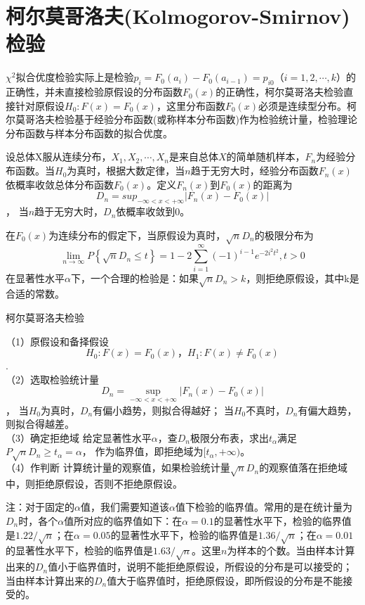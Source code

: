 \section{柯尔莫哥洛夫(Kolmogorov-Smirnov)检验}

$\chi^2$拟合优度检验实际上是检验$p_i=F_0(a_i)-F_0(a_{i-1})=p_{i0}（i=1,2,\cdots,k）$的正确性，并未直接检验原假设的分布函数$F_0(x)$的正确性，柯尔莫哥洛夫检验直接针对原假设$H_0:F(x)=F_0(x)$，这里分布函数$F_0(x)$必须是连续型分布。柯尔莫哥洛夫检验基于经验分布函数(或称样本分布函数)作为检验统计量，检验理论分布函数与样本分布函数的拟合优度。

设总体X服从连续分布，$X_1,X_2,\cdots,X_n$是来自总体$X$的简单随机样本，$F_n$为经验分布函数。当$H_0$为真时，根据大数定律，当$n$趋于无穷大时，经验分布函数$F_n(x)$依概率收敛总体分布函数$F_0(x)$。定义$F_n(x)$到$F_0(x)$的距离为
$$D_n={sup}_{-\infty<x<+\infty}\left|F_n(x)-F_0(x)\right|$$，
当$n$趋于无穷大时，$D_n$依概率收敛到$0$。

\begin{theorem}[Kolmogorov定理]  
    在$F_0(x)$为连续分布的假定下，当原假设为真时，$\sqrt n D_n$的极限分布为
$$ \lim _{n \rightarrow \infty} P\left\{\sqrt{n} D_{n} \leq t\right\}=1-2 \sum_{i=1}^{\infty}(-1)^{i-1} e^{-2 i^{2} t^{2}}, t>0 $$  
在显著性水平$\alpha$下，一个合理的检验是：如果$\sqrt n D_n>k$，则拒绝原假设，其中k是合适的常数。   
\end{theorem}

\begin{algorithm}[]
    \caption{柯尔莫哥洛夫检验}
     （1）原假设和备择假设
$$  H_0:F(x)=F_0(x)，H_1:F(x)\neq F_0(x)$$.\\
（2）选取检验统计量
$$D_n=\operatorname{sup}_{-\infty<x<+\infty} \left|F_n(x)-F_0(x)\right|$$，
当$H_0$为真时，$D_n$有偏小趋势，则拟合得越好；
当$H_0$不真时，$D_n$有偏大趋势，则拟合得越差。\\
（3）确定拒绝域
给定显著性水平$\alpha$，查$D_n$极限分布表，求出$t_\alpha$满足
$P{\sqrt n D_n\geq t_\alpha}=\alpha$，
作为临界值，即拒绝域为$[t_\alpha,+\infty)$。\\
（4）作判断
计算统计量的观察值，如果检验统计量$\sqrt n D_n$的观察值落在拒绝域中，则拒绝原假设，否则不拒绝原假设。   
\end{algorithm}

注：对于固定的$\alpha$值，我们需要知道该$\alpha$值下检验的临界值。常用的是在统计量为$D_n$时，各个$\alpha$值所对应的临界值如下：在$\alpha=0.1$的显著性水平下，检验的临界值是$1.22/\sqrt n$；在$\alpha=0.05$的显著性水平下，检验的临界值是$1.36/\sqrt n$；在$\alpha=0.01$的显著性水平下，检验的临界值是$1.63/\sqrt n$。这里$n$为样本的个数。当由样本计算出来的$D_n$值小于临界值时，说明不能拒绝原假设，所假设的分布是可以接受的；当由样本计算出来的$D_n$值大于临界值时，拒绝原假设，即所假设的分布是不能接受的。

